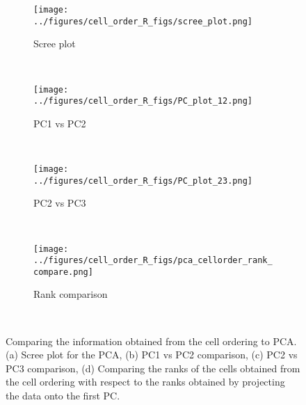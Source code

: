 \documentclass[11pt]{article}
\begin{document}
 \begin{figure*}[ht]
    \centering
     \begin{subfigure}[t]{0.5\textwidth}
        \centering
        \texttt{[image: ../figures/cell\_order\_R\_figs/scree\_plot.png]}
        \caption{Scree plot}
    \end{subfigure}%
    ~
    \begin{subfigure}[t]{0.5\textwidth}
        \centering
        \texttt{[image: ../figures/cell\_order\_R\_figs/PC\_plot\_12.png]}
        \caption{PC1 vs PC2}
    \end{subfigure}\\

     \begin{subfigure}[t]{0.5\textwidth}
        \centering
        \texttt{[image: ../figures/cell\_order\_R\_figs/PC\_plot\_23.png]}
        \caption{PC2 vs PC3}
    \end{subfigure}%
    ~
    \begin{subfigure}[t]{0.5\textwidth}
        \centering
        \texttt{[image: ../figures/cell\_order\_R\_figs/pca\_cellorder\_rank\_compare.png]}
        \caption{Rank comparison}
    \end{subfigure}\\
  \caption{Comparing the information obtained from the cell ordering to PCA. (a) Scree plot  for the PCA, (b) PC1 vs PC2 comparison,
  (c) PC2 vs PC3 comparison, (d) Comparing the ranks of the cells obtained from the cell ordering with respect to the ranks obtained by projecting the data onto the first PC.}
 \label{fig:fig6}
 \end{figure*}
\end{document}
